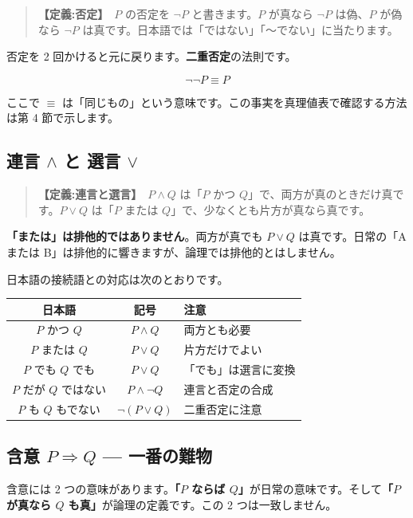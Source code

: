 \documentclass{article}
\begin{document}
\begin{quote}
\textbf{【定義:否定】}\ \(P\) の否定を \(\neg P\) と書きます。\(P\) が真なら \(\neg P\) は偽、\(P\) が偽なら \(\neg P\) は真です。日本語では「ではない」「〜でない」に当たります。
\end{quote}

否定を 2 回かけると元に戻ります。\textbf{二重否定}の法則です。

\[ \neg \neg P \equiv P \]

ここで \(\equiv\) は「同じもの」という意味です。この事実を真理値表で確認する方法は第 4 節で示します。

\subsection{連言 \(\land\) と 選言 \(\lor\)}

\begin{quote}
\textbf{【定義:連言と選言】}\ \(P \land Q\) は「\(P\) かつ \(Q\)」で、両方が真のときだけ真です。\(P \lor Q\) は「\(P\) または \(Q\)」で、少なくとも片方が真なら真です。
\end{quote}

\textbf{「または」は排他的ではありません}。両方が真でも \(P \lor Q\) は真です。日常の「A または B」は排他的に響きますが、論理では排他的とはしません。

日本語の接続語との対応は次のとおりです。

\begin{center}
\begin{tabular}{|c|c|l|}
\hline
日本語 & 記号 & 注意 \\
\hline
\(P\) かつ \(Q\) & \(P \land Q\) & 両方とも必要 \\
\(P\) または \(Q\) & \(P \lor Q\) & 片方だけでよい \\
\(P\) でも \(Q\) でも & \(P \lor Q\) & 「でも」は選言に変換 \\
\(P\) だが \(Q\) ではない & \(P \land \neg Q\) & 連言と否定の合成 \\
\(P\) も \(Q\) もでない & \(\neg (P \lor Q)\) & 二重否定に注意 \\
\hline
\end{tabular}
\end{center}

\subsection{含意 \(P \Rightarrow Q\) — 一番の難物}

含意には 2 つの意味があります。\textbf{「\(P\) ならば \(Q\)」}が日常の意味です。そして\textbf{「\(P\) が真なら \(Q\) も真」}が論理の定義です。この 2 つは一致しません。
\end{document}
